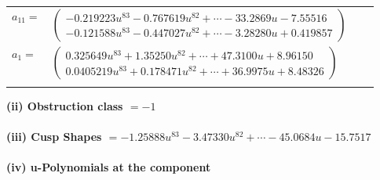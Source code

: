\documentclass[1p]{elsarticle_modified}
\theoremstyle{definition}
\begin{document}
\begin{tabular}{m{7pt} m{180pt} m{7pt} m{180pt} }
\flushright $a_{11}=$&$\begin{pmatrix}-0.219223 u^{83}-0.767619 u^{82}+\cdots-33.2869 u-7.55516\\-0.121588 u^{83}-0.447027 u^{82}+\cdots-3.28280 u+0.419857\end{pmatrix}$ \\
\flushright $a_{1}=$&$\begin{pmatrix}0.325649 u^{83}+1.35250 u^{82}+\cdots+47.3100 u+8.96150\\0.0405219 u^{83}+0.178471 u^{82}+\cdots+36.9975 u+8.48326\end{pmatrix}$\\&\end{tabular}
\flushleft \textbf{(ii) Obstruction class $= -1$}\\~\\
\flushleft \textbf{(iii) Cusp Shapes $= -1.25888 u^{83}-3.47330 u^{82}+\cdots-45.0684 u-15.7517$}\\~\\
\newpage\renewcommand{\arraystretch}{1}
\flushleft \textbf{(iv) u-Polynomials at the component}\newline \\
\end{document}
